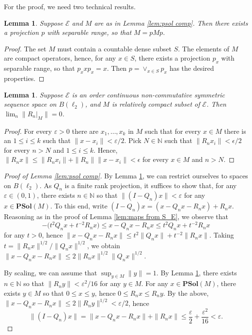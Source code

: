 \documentclass[12pt]{amsart}
\theoremstyle{plain}
\newtheorem{lemma}[theorem]{Lemma}
\theoremstyle{definition}
\renewcommand{\leq}{\leqslant}
\newcommand{\vr}{\varepsilon}
\newcommand{\N}{\mathbb N}
\newcommand{\ce}{\mathcal E}
\newcommand{\psol}{\mathbf{PSol}}
\def \vr{\varepsilon}
\begin{document}
For the proof, we need two technical results.

\begin{lemma}\label{lem:sep}
Suppose $\ce$ and $M$ are as in Lemma \ref{lem:psol comp}. Then there exists a
projection $p$ with separable range, so that $M = pMp$.
\end{lemma}

\begin{proof}
The set $M$ must contain a countable dense subset $S$. The elements
of $M$ are compact operators, hence, for any $x \in S$, there exists
a projection $p_x$ with separable range, so that $p_x x p_x = x$.
Then $p = \vee_{x \in S} p_x$ has the desired properties.
\end{proof}

\begin{lemma} \label{aprox}
Suppose $\ce$ is an order continuous non-commutative symmetric
sequence space on $B(\ell_2)$, and $M$ is relatively compact
subset of $\ce$. %
Then $\lim_n \|R_n|_{M}\| = 0$.
\end{lemma}

\begin{proof}
For every $\vr>0$  there are $x_1, \ldots, x_k$ in $M$ such that for every $x \in M$
there is an $1\le i \le k$ such that $\|x-x_i\| <\vr/2$.
Pick $N \in \mathbb{N}$ such that $\|R_nx_i\| <\epsilon/2$ for every $n>N$ and
$ 1\le i \le k$.
Hence, $\|R_nx\|  \le \|R_nx_i\| +\|R_n\|\|x-x_i\|<\epsilon$ for every $x \in M$ and $n>N$.
\end{proof}

\begin{proof}[Proof of Lemma \ref{lem:psol comp}]
By Lemma \ref{lem:sep}, we can restrict ourselves to spaces on $B(\ell_2)$.
As $Q_n$ is a finite rank projection, it suffices to show that,
for any $\vr \in (0,1)$,
there exists $n \in \N$ so that $\|(I - Q_n) x\| < \vr$ for any $x \in \psol(M)$.
To this end, write $(I - Q_n)x = (x - Q_n x - R_n x) + R_n x$.
Reasoning as in the proof of Lemma \ref{lem:maps from S_E}, we observe that
$$
- \big( t^2 Q_n x + t^{-2} R_n x \big)
 \leq x - Q_n x - R_n x \leq t^2 Q_n x + t^{-2} R_n x
$$
for any $t > 0$, hence
$\|x - Q_n x - R_n x\| \leq t^2 \|Q_n x\| + t^{-2} \|R_n x\|$.
Taking $t = \|R_n x\|^{1/2}/\|Q_n x\|^{1/2}$, we obtain
$\|x - Q_n x - R_n x\| \leq 2 \|R_n x\|^{1/2} \|Q_n x\|^{1/2}$.

By scaling, we can assume that $\sup_{y \in M} \|y\| = 1$. By Lemma \ref{aprox},
there exists $n \in \N$ so that $\|R_n y\| < \vr^2/16$ for any $y \in M$.
For any $x \in \psol(M)$, there exists $y \in M$ so that $0 \leq x \leq y$, hence
$0 \leq R_n x \leq R_n y$. By the above,
$\|x - Q_n x - R_n x\| \leq 2 \|R_n y\|^{1/2} < \vr/2$, hence
$$
\|(I - Q_n)x\| = \|x - Q_n x - R_n x\| + \|R_n x\| \leq
 \frac{\vr}{2} + \frac{\vr^2}{16} < \vr .
$$
\end{proof}
\end{document}
